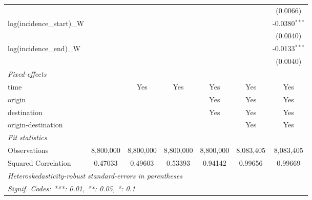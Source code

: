 \documentclass[10pt,a4paper]{article}
\begin{document}
\begin{tabular}{lcccccc}
                                                    &                &                &                 &                &                 & (0.0066)\\   
   log(incidence\_start)\_W                         &                &                &                 &                &                 & -0.0380$^{***}$\\   
                                                    &                &                &                 &                &                 & (0.0040)\\   
   log(incidence\_end)\_W                           &                &                &                 &                &                 & -0.0133$^{***}$\\   
                                                    &                &                &                 &                &                 & (0.0040)\\   
   \midrule
   \emph{Fixed-effects}\\
   time                                             &                & Yes            & Yes             & Yes            & Yes             & Yes\\  
   origin                                           &                &                &                 & Yes            & Yes             & Yes\\  
   destination                                      &                &                &                 & Yes            & Yes             & Yes\\  
   origin-destination                               &                &                &                 &                & Yes             & Yes\\  
   \midrule
   \emph{Fit statistics}\\
   Observations                                     & 8,800,000      & 8,800,000      & 8,800,000       & 8,800,000      & 8,083,405       & 8,083,405\\  
   Squared Correlation                              & 0.47033        & 0.49603        & 0.53393         & 0.94142        & 0.99656         & 0.99669\\  
   \midrule \midrule
   \multicolumn{7}{l}{\emph{Heteroskedasticity-robust standard-errors in parentheses}}\\
   \multicolumn{7}{l}{\emph{Signif. Codes: ***: 0.01, **: 0.05, *: 0.1}}\\
\end{tabular}
\par\endgroup
\end{document}
